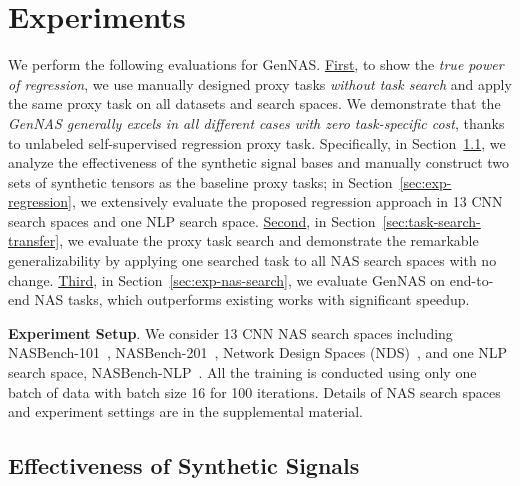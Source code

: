 \documentclass{article}
\begin{document}
\vspace{-8pt}
\section{Experiments~\label{sec:Experiment}}
\vspace{-6pt}

We perform the following evaluations for GenNAS.
\underline{First}, to show the \textit{true power of regression}, we use manually designed proxy tasks \textit{without task search} and apply the same proxy task on all datasets and search spaces. We demonstrate that the \textit{GenNAS generally excels in all different cases with zero task-specific cost}, thanks to unlabeled self-supervised regression proxy task.
Specifically, in Section~\ref{sec:ablation-signals}, we analyze the effectiveness of the synthetic signal bases and manually construct two sets of synthetic tensors as the baseline proxy tasks;
in Section~\ref{sec:exp-regression}, we extensively evaluate the proposed regression approach in 13 CNN search spaces and one NLP search space.
\underline{Second}, in Section~\ref{sec:task-search-transfer}, we evaluate the proxy task search and demonstrate the remarkable generalizability by applying one searched task to all NAS search spaces with no change.
\underline{Third}, in Section~\ref{sec:exp-nas-search}, we evaluate GenNAS on end-to-end NAS tasks, which outperforms existing works with significant speedup. 

\textbf{Experiment Setup}. We consider 13 CNN NAS search spaces including NASBench-101~\cite{ying2019bench}, NASBench-201~\cite{dong2020bench}, Network Design Spaces (NDS)~\cite{radosavovic2019network}, and one NLP search space, NASBench-NLP~\cite{klyuchnikov2020bench}. 
All the training is conducted using only one batch of data with batch size 16 for 100 iterations. Details of NAS search spaces and experiment settings are in the supplemental material.



\vspace{-5pt}
\subsection{Effectiveness of Synthetic Signals} 
\label{sec:ablation-signals}
\vspace{-4pt}
\end{document}

